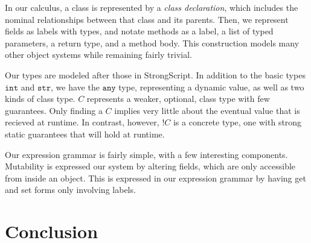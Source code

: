 \documentclass{llncs}
\newcommand{\strt}{\texttt{str}}
\newcommand{\intt}{\texttt{int}}
\newcommand{\anyt}{\texttt{any}}
\begin{document}
In our calculus, a class is represented by a \emph{class declaration}, which 
includes the nominal relationships between that class and its parents. Then, we 
represent fields as labels with types, and notate methods as a label, a list 
of typed parameters, a return type, and a method body. This construction models 
many other object systems while remaining fairly trivial.

Our types are modeled after those in StrongScript. In addition to the basic 
types $\intt$ and $\strt$, we have the $\anyt$ type, representing a dynamic 
value, as well as two kinds of class type. $C$ represents a weaker, optional, 
class type with few guarantees. Only finding a $C$ implies very little about 
the eventual value that is recieved at runtime. In contrast, however, $!C$ is 
a concrete type, one with strong static guarantees that will hold at runtime. 

Our expression grammar is fairly simple, with a few interesting components. 
Mutability is expressed our system by altering fields, which are only 
accessible from inside an object. This is expressed in our expression
grammar by having get and set forms only involving labels. 

\section{Conclusion}




\end{document}

